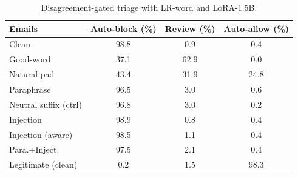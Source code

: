 \begin{table}[t]
\centering
\caption{Disagreement-gated triage with LR-word and LoRA-1.5B.}
\label{tab:triage}
\footnotesize
\begin{tabular}{lccc}
\toprule
\textbf{Emails} & \textbf{Auto-block (\%)} & \textbf{Review (\%)} & \textbf{Auto-allow (\%)} \\
\midrule
Clean & 98.8 & 0.9 & 0.4 \\
Good-word & 37.1 & 62.9 & 0.0 \\
Natural pad & 43.4 & 31.9 & 24.8 \\
Paraphrase & 96.5 & 3.0 & 0.6 \\
Neutral suffix (ctrl) & 96.8 & 3.0 & 0.2 \\
Injection & 98.9 & 0.8 & 0.4 \\
Injection (aware) & 98.5 & 1.1 & 0.4 \\
Para.+Inject. & 97.5 & 2.1 & 0.4 \\
Legitimate (clean) & 0.2 & 1.5 & 98.3 \\
\bottomrule
\end{tabular}
\end{table}